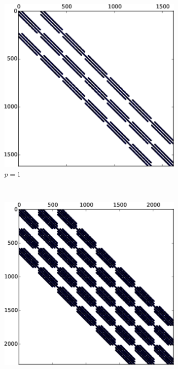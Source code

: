 { \begin{figure}[ht]
     \centering
     \begin{subfigure}{0.31\columnwidth}
         \centering
         \includegraphics[width=\textwidth]{P3d_p1-crop_small.pdf}%
         \caption{$p=1$}
     \end{subfigure}%
     ~ 
     \begin{subfigure}{0.31\columnwidth}
         \centering
         \includegraphics[width=\textwidth]{P3d_p2-crop_small.pdf}%

\end{subfigure}
\end{figure}}
